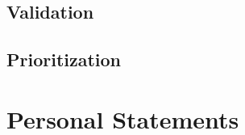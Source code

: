 \documentclass[10pt,a4paper]{article}
\begin{document}
\subsection{Validation}

\subsection{Prioritization}

\section{Personal Statements}
\end{document}
